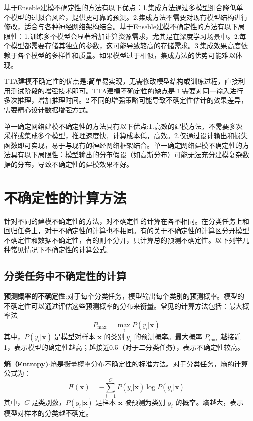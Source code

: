 基于Enseble建模不确定性的方法有以下优点：1.集成方法通过多模型组合降低单个模型的过拟合风险，提供更可靠的预测。2.集成方法不需要对现有模型结构进行修改，适合与各种神经网络架构结合。基于Enseble建模不确定性的方法有以下局限性：1.训练多个模型会显著增加计算资源需求，尤其是在深度学习场景中。2.每个模型都需要存储其独立的参数，这可能导致较高的存储需求。3.集成效果高度依赖于各个模型的多样性和质量。如果模型过于相似，集成方法的优势可能难以体现。

TTA建模不确定性的优点是:简单易实现，无需修改模型结构或训练过程，直接利用测试阶段的增强技术即可。TTA建模不确定性的缺点是:1.需要对同一输入进行多次推理，增加推理时间。2.不同的增强策略可能导致不确定性估计的效果差异，需要精心设计数据增强方式。


单一确定网络建模不确定性的方法具有以下优点:1.高效的建模方法，不需要多次采样或集成多个模型，推理速度快，计算成本低，高效。2.仅通过设计输出和损失函数即可实现，易于与现有的神经网络框架结合。单一确定网络建模不确定性的方法具有以下局限性：模型输出的分布假设（如高斯分布）可能无法充分建模复杂数据的分布，导致不确定性的建模效果不好。

\section{不确定性的计算方法}
针对不同的建模不确定性的方法，对不确定性的计算在各不相同。在分类任务上和回归任务上，对于不确定性的计算也不相同。有的关于不确定性的计算区分开模型不确定性和数据不确定性，有的则不分开，只计算总的预测不确定性。以下列举几种常见情况下不确定性的计算公式。

\subsection{分类任务中不确定性的计算}

\textbf{预测概率的不确定性}:对于每个分类任务，模型输出每个类别的预测概率。模型的不确定性可以通过评估这些预测概率的分布来衡量。常见的计算方法包括：最大概率法
    \[
    P_{\text{max}} = \max_{i} P(y_i | \mathbf{x})
    \]
    其中，\( P(y_i | \mathbf{x}) \) 是模型对样本 \( \mathbf{x} \) 的类别 \( y_i \) 的预测概率。最大概率 \( P_{\text{max}} \) 越接近1，表示模型的确定性越高；越接近0.5（对于二分类任务），表示不确定性较高。


\textbf{熵（Entropy)}:熵是衡量概率分布不确定性的标准方法。对于分类任务，熵的计算公式为：
\[
H(\mathbf{x}) = - \sum_{i=1}^{C} P(y_i | \mathbf{x}) \log P(y_i | \mathbf{x})
\]
其中，\( C \) 是类别数，\( P(y_i | \mathbf{x}) \) 是样本 \( \mathbf{x} \) 被预测为类别 \( y_i \) 的概率。熵越大，表示模型对样本的分类越不确定。

